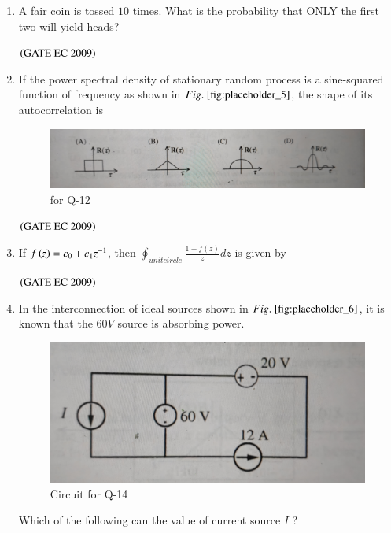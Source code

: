 \documentclass[journal,12pt,onecolumn]{IEEEtran}
\theoremstyle{remark}
\begin{document}
\begin{enumerate}[start=1, label={Q\arabic*.}]
\item A fair coin is tossed $10$ times. What is the probability that ONLY the first two will yield heads?
\begin{enumerate}
\end{enumerate}
\hfill $\left(\text{GATE EC 2009}\right)$

\item If the power spectral density of stationary random process is a sine-squared function of frequency as shown in $\figref{fig:placeholder_5}$, the shape of its autocorrelation is
\begin{figure}[H]
    \centering
    \includegraphics[width=0.5\columnwidth]{figs/fig_5.jpg}
    \caption{\centering for Q-12}
    \label{fig:placeholder_5}
\end{figure}
\hfill $\left(\text{GATE EC 2009}\right)$

\item If $f\left(z\right) = c_0 + c_1z^{-1}$, then $\oint_{unit circle} \frac{1+f(z)}{z} dz$ is given by
\begin{enumerate}
\end{enumerate}
\hfill $\left(\text{GATE EC 2009}\right)$

\item In the interconnection of ideal sources shown in $\figref{fig:placeholder_6}$, it is known that the $60 V$ source is absorbing power.
\begin{figure}[H]
    \centering
    \includegraphics[width=0.5\columnwidth]{figs/fig_6.jpg}
    \caption{\centering Circuit for Q-14}
    \label{fig:placeholder_6}
\end{figure}
Which of the following can the value of current source ${I}$ ?


\end{enumerate}
\end{document}
